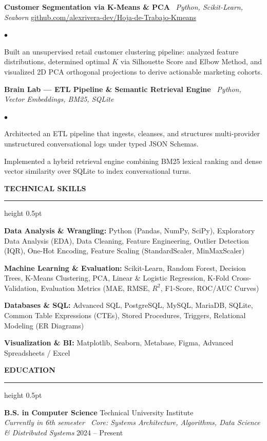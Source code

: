 \documentclass[10pt,letterpaper]{article}
\newcommand{\resumesection}[1]{%
  \vspace{2pt}%
  {\color{primary}\normalsize\bfseries\MakeUppercase{#1}}%
  \vspace{1pt}\hrule height 0.5pt\vspace{2pt}%
}
\renewenvironment{itemize}{%
  \begin{list}{\color{primary}$\bullet$}{%
    \setlength{\leftmargin}{1.1em}%
    \setlength{\itemsep}{0.5pt}%
    \setlength{\topsep}{1pt}%
    \setlength{\parsep}{0pt}%
    \setlength{\partopsep}{0pt}%
  }%
}{%
  \end{list}%
}
\newenvironment{skilllist}{%
  \begin{list}{}{%
    \setlength{\leftmargin}{0pt}%
    \setlength{\itemsep}{0.5pt}%
    \setlength{\topsep}{1pt}%
    \setlength{\parsep}{0pt}%
    \setlength{\partopsep}{0pt}%
  }%
}{%
  \end{list}%
}
\begin{document}
\vspace{1pt}

\textbf{Customer Segmentation via K-Means \& PCA} \textbar\ \textit{Python, Scikit-Learn, Seaborn} \hfill \href{https://github.com/alexrivera-dev/Hoja-de-Trabajo-Kmeans}{github.com/alexrivera-dev/Hoja-de-Trabajo-Kmeans}
\begin{itemize}
    \item Built an unsupervised retail customer clustering pipeline: analyzed feature distributions, determined optimal $K$ via Silhouette Score and Elbow Method, and visualized 2D PCA orthogonal projections to derive actionable marketing cohorts.
\end{itemize}

\vspace{1pt}

\textbf{Brain Lab — ETL Pipeline \& Semantic Retrieval Engine} \textbar\ \textit{Python, Vector Embeddings, BM25, SQLite}
\begin{itemize}
    \item Architected an ETL pipeline that ingests, cleanses, and structures multi-provider unstructured conversational logs under typed JSON Schemas.
    \item Implemented a hybrid retrieval engine combining BM25 lexical ranking and dense vector similarity over SQLite to index conversational turns.
\end{itemize}

\resumesection{Technical Skills}
\begin{skilllist}
    \item \textbf{Data Analysis \& Wrangling:} Python (Pandas, NumPy, SciPy), Exploratory Data Analysis (EDA), Data Cleaning, Feature Engineering, Outlier Detection (IQR), One-Hot Encoding, Feature Scaling (StandardScaler, MinMaxScaler)
    \item \textbf{Machine Learning \& Evaluation:} Scikit-Learn, Random Forest, Decision Trees, K-Means Clustering, PCA, Linear \& Logistic Regression, K-Fold Cross-Validation, Evaluation Metrics (MAE, RMSE, $R^2$, F1-Score, ROC/AUC Curves)
    \item \textbf{Databases \& SQL:} Advanced SQL, PostgreSQL, MySQL, MariaDB, SQLite, Common Table Expressions (CTEs), Stored Procedures, Triggers, Relational Modeling (ER Diagrams)
    \item \textbf{Visualization \& BI:} Matplotlib, Seaborn, Metabase, Figma, Advanced Spreadsheets / Excel
\end{skilllist}

\resumesection{Education}
\textbf{B.S. in Computer Science} \hfill Technical University Institute \\
\textit{Currently in 6th semester \textbar\ Core: Systems Architecture, Algorithms, Data Science \& Distributed Systems} \hfill 2024 -- Present
\end{document}
